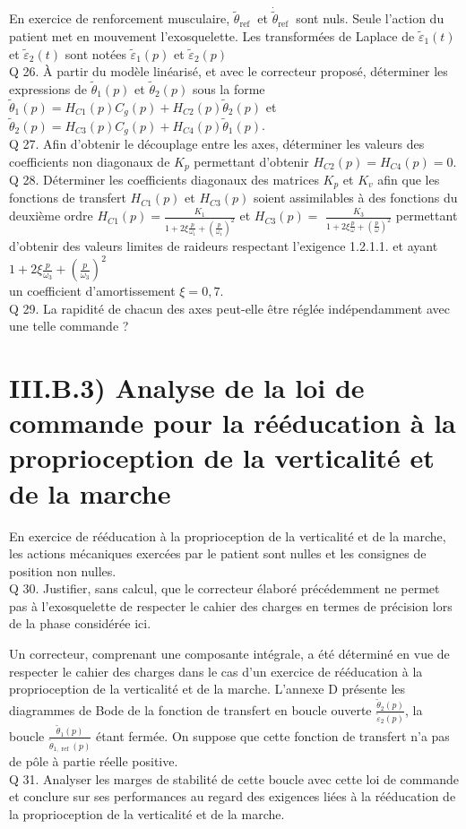 \documentclass[10pt]{article}
\begin{document}
En exercice de renforcement musculaire, $\tilde{\theta}_{\text {ref }}$ et $\dot{\tilde{\theta}}_{\text {ref }}$ sont nuls. Seule l'action du patient met en mouvement l'exosquelette. Les transformées de Laplace de $\tilde{\varepsilon}_{1}(t)$ et $\tilde{\varepsilon}_{2}(t)$ sont notées $\tilde{\varepsilon}_{1}(p)$ et $\tilde{\varepsilon}_{2}(p)$\\
Q 26. À partir du modèle linéarisé, et avec le correcteur proposé, déterminer les expressions de $\tilde{\theta}_{1}(p)$ et $\tilde{\theta}_{2}(p)$ sous la forme $\tilde{\theta}_{1}(p)=H_{C 1}(p) C_{g}(p)+H_{C 2}(p) \tilde{\theta}_{2}(p)$ et $\tilde{\theta}_{2}(p)=H_{C 3}(p) C_{g}(p)+H_{C 4}(p) \tilde{\theta}_{1}(p)$.\\
Q 27. Afin d'obtenir le découplage entre les axes, déterminer les valeurs des coefficients non diagonaux de $K_{p}$ permettant d'obtenir $H_{C 2}(p)=H_{C 4}(p)=0$.\\
Q 28. Déterminer les coefficients diagonaux des matrices $K_{p}$ et $K_{v}$ afin que les fonctions de transfert $H_{C 1}(p)$ et $H_{C 3}(p)$ soient assimilables à des fonctions du deuxième ordre $H_{C 1}(p)=\frac{K_{1}}{1+2 \xi \frac{p}{\omega_{1}}+\left(\frac{p}{\omega_{1}}\right)^{2}}$ et $H_{C 3}(p)=$ $\frac{K_{3}}{1+2 \xi \frac{p}{\omega}+\left(\frac{p}{\omega}\right)^{2}}$ permettant d'obtenir des valeurs limites de raideurs respectant l'exigence 1.2.1.1. et ayant $1+2 \xi \frac{p}{\omega_{3}}+\left(\frac{p}{\omega_{3}}\right)^{2}$\\
un coefficient d'amortissement $\xi=0,7$.\\
Q 29. La rapidité de chacun des axes peut-elle être réglée indépendamment avec une telle commande ?

\section*{III.B.3) Analyse de la loi de commande pour la rééducation à la proprioception de la verticalité et de la marche}
En exercice de rééducation à la proprioception de la verticalité et de la marche, les actions mécaniques exercées par le patient sont nulles et les consignes de position non nulles.\\
Q 30. Justifier, sans calcul, que le correcteur élaboré précédemment ne permet pas à l'exosquelette de respecter le cahier des charges en termes de précision lors de la phase considérée ici.

Un correcteur, comprenant une composante intégrale, a été déterminé en vue de respecter le cahier des charges dans le cas d'un exercice de rééducation à la proprioception de la verticalité et de la marche. L'annexe D présente les diagrammes de Bode de la fonction de transfert en boucle ouverte $\frac{\tilde{\theta}_{2}(p)}{\tilde{\varepsilon}_{2}(p)}$, la boucle $\frac{\tilde{\theta}_{1}(p)}{\tilde{\theta}_{1, \text { ref }}(p)}$ étant fermée. On suppose que cette fonction de transfert n'a pas de pôle à partie réelle positive.\\
Q 31. Analyser les marges de stabilité de cette boucle avec cette loi de commande et conclure sur ses performances au regard des exigences liées à la rééducation de la proprioception de la verticalité et de la marche.
\end{document}
